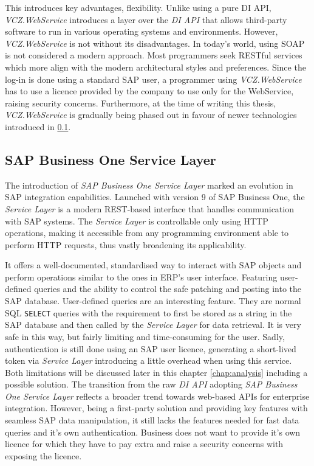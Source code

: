 This introduces key advantages, flexibility. 
Unlike using a pure DI API, \textit{VCZ.WebService} introduces a layer over the \textit{DI API} that allows third-party software to run in various operating systems and environments.
However, \textit{VCZ.WebService} is not without its disadvantages.
In today's world, using SOAP is not considered a modern approach. Most programmers seek RESTful services which more align with the modern architectural styles and preferences.
Since the log-in is done using a standard SAP user, a programmer using \textit{VCZ.WebService} has to use a licence provided by the company to use only for the WebService, raising security concerns.
Furthermore, at the time of writing this thesis, \textit{VCZ.WebService} is gradually being phased out in favour of newer technologies introduced in \ref{subsec:sap-b1-service-layer}.

\subsection{SAP Business One Service Layer}
\label{subsec:sap-b1-service-layer}

The introduction of \textit{ SAP Business One Service Layer} marked an evolution in SAP integration capabilities. 
Launched with version 9 of SAP Business One, the \textit{Service Layer} is a modern REST-based interface that handles communication with SAP systems. 
The \textit{Service Layer} is controllable only using HTTP operations, making it accessible from any programming environment able to perform HTTP requests, thus vastly broadening its applicability.

It offers a well-documented, standardised way to interact with SAP objects and perform operations similar to the ones in ERP's user interface. 
Featuring user-defined queries and the ability to control the safe patching and posting into the SAP database.
User-defined queries are an interesting feature. They are normal SQL \texttt{SELECT} queries with the requirement to first be stored as a string in the SAP database and then called by the \textit{ Service Layer} for data retrieval.
It is very safe in this way, but fairly limiting and time-consuming for the user. 
Sadly, authentication is still done using an SAP user licence, generating a short-lived token via \textit{Service Layer} introducing a little overhead when using this service.
Both limitations will be discussed later in this chapter \ref{chap:analysis} including a possible solution.
The transition from the raw \textit{DI API} adopting \textit{SAP Business One Service Layer} reflects a broader trend towards web-based APIs for enterprise integration.
However, being a first-party solution and providing key features with seamless SAP data manipulation, it still lacks the features needed for fast data queries and it's own authentication. Business does not want to provide it's own licence for which they have to pay extra and raise a security concerns with exposing the licence.

